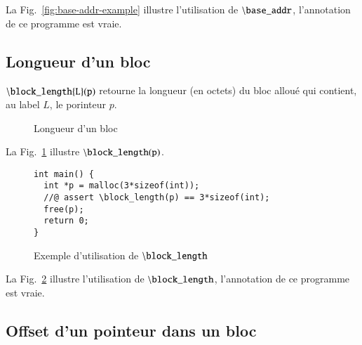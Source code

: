 \documentclass[french]{spimufcphdthesis}
\begin{document}
La Fig.~\ref{fig:base-addr-example}
illustre l'utilisation de ${\tt \backslash base\_addr}$, l'annotation de ce
programme est vraie.


\subsection{Longueur d'un bloc}

${\tt \backslash block\_length\{L\}(p)}$ retourne la longueur (en octets) du
bloc alloué qui contient, au label $L$, le porinteur $p$. 


\begin{figure}[h]
  \begin{center}
  \end{center}
  \caption{Longueur d'un bloc}
  \label{fig:block-length}
\end{figure}

La Fig.~\ref{fig:block-length} illustre ${\tt \backslash block\_length(p)}$.

\begin{figure}[h]
\begin{lstlisting}
int main() {
  int *p = malloc(3*sizeof(int));
  //@ assert \block_length(p) == 3*sizeof(int);
  free(p);
  return 0;
}
\end{lstlisting}
\caption{Exemple d'utilisation de ${\tt \backslash block\_length}$}
\label{fig:block-length-example}
\end{figure}

La Fig.~\ref{fig:block-length-example} illustre l'utilisation de
${\tt \backslash block\_length}$, l'annotation de ce programme est vraie.


\subsection{Offset d'un pointeur dans un bloc}
\end{document}
